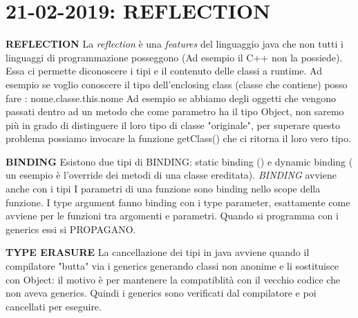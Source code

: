

\newpage
\section{21-02-2019: REFLECTION}
\textbf{REFLECTION} \newline
La \textit{reflection} è una \textit{features} del linguaggio java che non tutti i linguaggi di programmazione posseggono (Ad esempio il C++ non la possiede). Essa ci permette diconoscere i tipi e il contenuto delle classi  a runtime. Ad esempio se voglio conoscere il tipo dell'enclosing class (classe che contiene) posso fare : nome.classe.this.nome  \newline
Ad esempio se abbiamo degli oggetti che vengono passati dentro ad un metodo che come parametro ha il tipo Object, non saremo più in grado di distinguere il loro tipo di classe "originale", per superare questo problema possiamo invocare la funzione getClass() che ci ritorna il loro vero tipo.

\noindent \textbf{BINDING} \newline
Esistono due tipi di BINDING: static binding () e dynamic binding ( un esempio è l'override dei metodi di una classe ereditata).\newline
\textit{BINDING} avviene anche con i tipi \newline
I parametri di una funzione sono binding nello scope della funzione.\newline
I type argument fanno binding con i type parameter, esattamente come avviene per le funzioni tra argomenti e parametri. \newline
Quando si programma con i generics essi si PROPAGANO. 

\noindent \textbf{TYPE ERASURE} \newline
La cancellazione dei tipi in java avviene quando il compilatore "butta" via i generics generando classi non anonime e li sostituisce con Object: il motivo è per mantenere la compatiblità con il vecchio codice che non aveva generics. Quindi i generics sono verificati dal compilatore e poi cancellati per eseguire.














